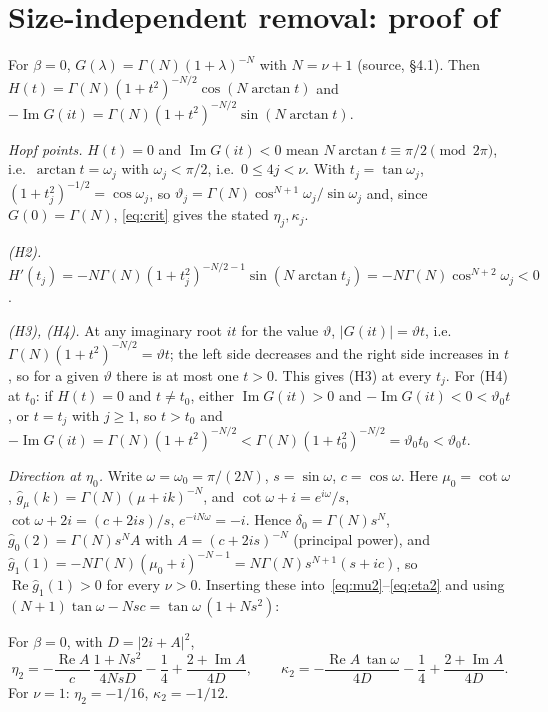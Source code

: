\documentclass[11pt,a4paper]{report}
\newcommand{\vth}{\vartheta}
\newcommand{\gh}{\hat g}
\begin{document}
\section{Size-independent removal: proof of \texorpdfstring{}{Theorem B}}\label{sec:beta0}

For $\beta=0$, $G(\lambda)=\Gamma(N)(1+\lambda)^{-N}$ with $N=\nu+1$ (source, \S4.1). Then $H(t)=\Gamma(N)(1+t^2)^{-N/2}\cos(N\arctan t)$ and $-\operatorname{Im}G(it)=\Gamma(N)(1+t^2)^{-N/2}\sin(N\arctan t)$.

\emph{Hopf points.} $H(t)=0$ and $\operatorname{Im}G(it)<0$ mean $N\arctan t\equiv\pi/2\pmod{2\pi}$, i.e.\ $\arctan t=\omega_j$ with $\omega_j<\pi/2$, i.e.\ $0\le4j<\nu$. With $t_j=\tan\omega_j$, $(1+t_j^2)^{-1/2}=\cos\omega_j$, so $\vth_j=\Gamma(N)\cos^{N+1}\omega_j/\sin\omega_j$ and, since $G(0)=\Gamma(N)$, \eqref{eq:crit} gives the stated $\eta_j,\kappa_j$.

\emph{(H2).} $H'(t_j)=-N\Gamma(N)(1+t_j^2)^{-N/2-1}\sin(N\arctan t_j)=-N\Gamma(N)\cos^{N+2}\omega_j<0$.

\emph{(H3), (H4).} At any imaginary root $it$ for the value $\vth$, $|G(it)|=\vth t$, i.e.\ $\Gamma(N)(1+t^2)^{-N/2}=\vth t$; the left side decreases and the right side increases in $t$, so for a given $\vth$ there is at most one $t>0$. This gives (H3) at every $t_j$. For (H4) at $t_0$: if $H(t)=0$ and $t\neq t_0$, either $\operatorname{Im}G(it)>0$ and $-\operatorname{Im}G(it)<0<\vth_0t$, or $t=t_j$ with $j\ge1$, so $t>t_0$ and $-\operatorname{Im}G(it)=\Gamma(N)(1+t^2)^{-N/2}<\Gamma(N)(1+t_0^2)^{-N/2}=\vth_0t_0<\vth_0t$.

\emph{Direction at $\eta_0$.} Write $\omega=\omega_0=\pi/(2N)$, $s=\sin\omega$, $c=\cos\omega$. Here $\mu_0=\cot\omega$, $\gh_\mu(k)=\Gamma(N)(\mu+ik)^{-N}$, and $\cot\omega+i=e^{i\omega}/s$, $\cot\omega+2i=(c+2is)/s$, $e^{-iN\omega}=-i$. Hence $\delta_0=\Gamma(N)s^N$, $\gh_0(2)=\Gamma(N)s^NA$ with $A=(c+2is)^{-N}$ (principal power), and $\gh_1(1)=-N\Gamma(N)(\mu_0+i)^{-N-1}=N\Gamma(N)s^{N+1}(s+ic)$, so $\operatorname{Re}\gh_1(1)>0$ for every $\nu>0$. Inserting these into~\eqref{eq:mu2}--\eqref{eq:eta2} and using $(N+1)\tan\omega-Nsc=\tan\omega\,(1+Ns^2)$:

\begin{proposition}\label{prop:beta0eta2}
For $\beta=0$, with $D=|2i+A|^2$,
\[
\eta_2=-\frac{\operatorname{Re}A}{c}\,\frac{1+Ns^2}{4NsD}-\frac14+\frac{2+\operatorname{Im}A}{4D},\qquad
\kappa_2=-\frac{\operatorname{Re}A\,\tan\omega}{4D}-\frac14+\frac{2+\operatorname{Im}A}{4D}.
\]
For $\nu=1$: $\eta_2=-1/16$, $\kappa_2=-1/12$.
\end{proposition}
\end{document}
